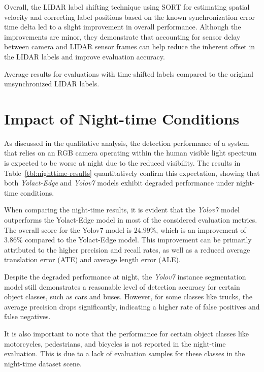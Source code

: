 Overall, the LIDAR label shifting technique using SORT for estimating spatial velocity and correcting label positions based on the known synchronization error time delta led to a slight improvement in overall performance.
Although the improvements are minor, they demonstrate that accounting for sensor delay between camera and LIDAR sensor frames can help reduce the inherent offset in the LIDAR labels and improve evaluation accuracy.

\begin{table}[htb]
    
    \caption{Average results for evaluations with time-shifted labels compared to the original unsynchronized LIDAR labels.}
    \label{tbl:label-shift-results}
\end{table}


\section{Impact of Night-time Conditions}
\label{sec:weather}

As discussed in the qualitative analysis, the detection performance of a system that relies on an RGB camera operating within the human visible light spectrum is expected to be worse at night due to the reduced visibility.
The results in Table~\ref{tbl:nighttime-results} quantitatively confirm this expectation, showing that both \textit{Yolact-Edge} and \textit{Yolov7} models exhibit degraded performance under night-time conditions.

When comparing the night-time results, it is evident that the \textit{Yolov7} model outperforms the Yolact-Edge model in most of the considered evaluation metrics.
The overall score for the Yolov7 model is $24.99\%$, which is an improvement of $3.86\%$ compared to the Yolact-Edge model.
This improvement can be primarily attributed to the higher precision and recall rates, as well as a reduced average translation error (ATE) and average length error (ALE).

Despite the degraded performance at night, the \textit{Yolov7} instance segmentation model still demonstrates a reasonable level of detection accuracy for certain object classes, such as cars and buses.
However, for some classes like trucks, the average precision drops significantly, indicating a higher rate of false positives and false negatives.

It is also important to note that the performance for certain object classes like motorcycles, pedestrians, and bicycles is not reported in the night-time evaluation.
This is due to a lack of evaluation samples for these classes in the night-time dataset scene.

